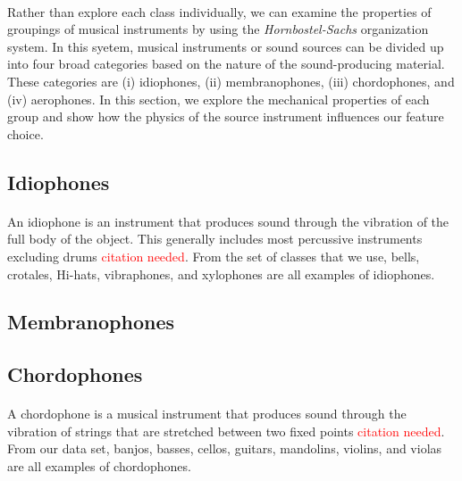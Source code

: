 \documentclass[12pt,letterpaper]{article}
\begin{document}
\paragraph*{}Rather than explore each class individually, we can examine the properties of groupings of musical instruments by using the \textit{Hornbostel-Sachs} organization system. In this syetem, musical instruments or sound sources can be divided up into four broad categories based on the nature of the sound-producing material. These categories are (i) idiophones, (ii) membranophones, (iii) chordophones, and (iv) aerophones. In this section, we explore the mechanical properties of each group and show how the physics of the source instrument influences our feature choice.



\subsection{Idiophones}
\label{subsec-Idiophone}

\paragraph*{}An idiophone is an instrument that produces sound through the vibration of the full body of the object. This generally includes most percussive instruments excluding drums \textcolor{red}{citation needed}. From the set of classes that we use, bells, crotales, Hi-hats, vibraphones, and xylophones are all examples of idiophones. 


\subsection{Membranophones}
\label{subsec-membranophones}


\subsection{Chordophones}
\label{subsec-chordophones}

\paragraph*{}A chordophone is a musical instrument that produces sound through the vibration of strings that are stretched between two fixed points \textcolor{red}{citation needed}. From our data set, banjos, basses, cellos, guitars, mandolins, violins, and violas are all examples of chordophones.
\end{document}
